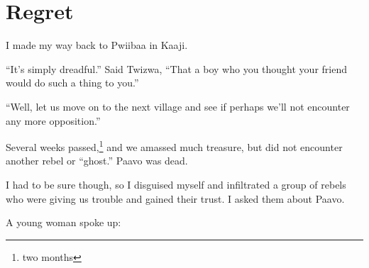 \chapter{Regret}

I made my way back to Pwiibaa in Kaaji.

``It's simply dreadful.'' Said Twizwa, ``That a boy who you thought your friend would do such a thing to you.''

``Well, let us move on to the next village and see if perhaps we'll not encounter any more opposition.''

Several weeks passed,\footnote{two months} and we amassed much treasure, but did not encounter another rebel or ``ghost.'' Paavo was dead.

I had to be sure though, so I disguised myself and infiltrated a group of rebels who were giving us trouble and gained their trust. I asked them about Paavo.

A young woman spoke up:

